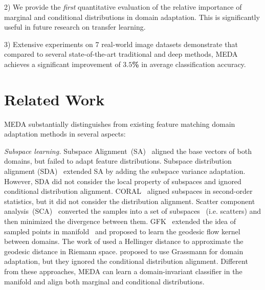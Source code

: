 \documentclass[sigconf]{acmart}
\begin{document}
2) We provide the \textit{first} quantitative evaluation of the relative importance of marginal and conditional distributions in domain adaptation. This is significantly useful in future research on transfer learning.

3) Extensive experiments on 7 real-world image datasets demonstrate that compared to several state-of-the-art traditional and deep methods, MEDA achieves a significant improvement of $\bm{3.5}$\textbf{\%} in average classification accuracy.

\section{Related Work}
\label{sec-related}

MEDA substantially distinguishes from existing feature matching domain adaptation methods in several aspects:

\textit{Subspace learning.} Subspace Alignment~(SA)~\cite{fernando2013unsupervised} aligned the base vectors of both domains, but failed to adapt feature distributions. Subspace distribution alignment (SDA)~\cite{sun2015subspace} extended SA by adding the subspace variance adaptation. However, SDA did not consider the local property of subspaces and ignored conditional distribution alignment. CORAL~\cite{sun2016return} aligned subspaces in second-order statistics, but it did not consider the distribution alignment. Scatter component analysis~(SCA)~\cite{ghifary2017scatter} converted the samples into a set of subspaces ~(i.e. scatters) and then minimized the divergence between them. GFK~\cite{gong2012geodesic} extended the idea of sampled points in manifold~\cite{gopalan2011domain} and proposed to learn the geodesic flow kernel between domains. The work of \cite{baktashmotlagh2014domain} used a Hellinger distance to approximate the geodesic distance in Riemann space. \cite{baktashmotlagh2013unsupervised} proposed to use Grassmann for domain adaptation, but they ignored the conditional distribution alignment. Different from these approaches, MEDA can learn a domain-invariant classifier in the manifold and align both marginal and conditional distributions.
\end{document}
